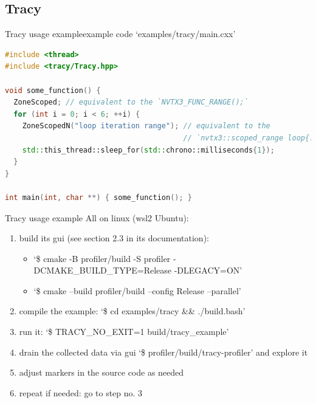 \documentclass[aspectratio=169]{beamer}
\begin{document}
\subsection{Tracy}

\begin{frame}[fragile]{Tracy usage example}{example code `examples/tracy/main.cxx'}
    
    \begin{lstlisting}[language=C++]
#include <thread>
#include <tracy/Tracy.hpp>

void some_function() {
  ZoneScoped; // equivalent to the `NVTX3_FUNC_RANGE();`
  for (int i = 0; i < 6; ++i) {
    ZoneScopedN("loop iteration range"); // equivalent to the
                                         // `nvtx3::scoped_range loop{...};`
    std::this_thread::sleep_for(std::chrono::milliseconds{1});
  }
}

int main(int, char **) { some_function(); }
    \end{lstlisting}

\end{frame}

\begin{frame}{Tracy usage example}
    All on linux (wsl2 Ubuntu):

    \begin{enumerate}
        \item build its gui (see section 2.3 in its documentation):
        \begin{itemize}
            \item `\$ cmake -B profiler/build -S profiler -DCMAKE\_BUILD\_TYPE=Release -DLEGACY=ON'
            \item `\$ cmake --build profiler/build --config Release --parallel'
        \end{itemize}
        \item compile the example: `\$ cd examples/tracy \&\& ./build.bash'
        \item run it: `\$ TRACY\_NO\_EXIT=1 build/tracy\_example'
        \item drain the collected data via gui `\$ profiler/build/tracy-profiler' and explore it
        \item adjust markers in the source code as needed
        \item repeat if needed: go to step no. 3
    \end{enumerate}

\end{frame}
\end{document}

